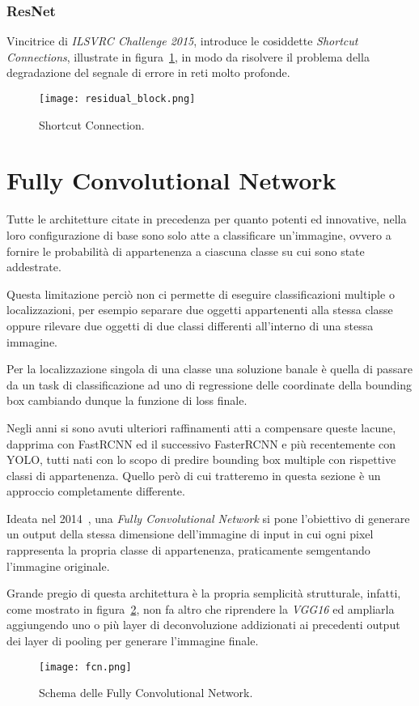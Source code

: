 \subsubsection{ResNet}
\cite{resnet}Vincitrice di \textit{ILSVRC Challenge 2015}, introduce le cosiddette \textit{Shortcut Connections}, illustrate in figura~\ref{fig:residual}, in modo da risolvere il problema della degradazione del segnale di errore in reti molto profonde.

\begin{figure}[H]
	\centering
	\texttt{[image: residual\_block.png]}
	\caption{Shortcut Connection.}
\label{fig:residual}
\end{figure}


\section{Fully Convolutional Network}
\label{sec:FCN}
Tutte le architetture citate in precedenza per quanto potenti ed innovative, nella loro configurazione di base sono solo atte a classificare un'immagine, ovvero a fornire le probabilità di appartenenza a ciascuna classe su cui sono state addestrate.\par
Questa limitazione perciò non ci permette di eseguire classificazioni multiple o localizzazioni, per esempio separare due oggetti appartenenti alla stessa classe oppure rilevare due oggetti di due classi differenti all'interno di una stessa immagine.\par
Per la localizzazione singola di una classe una soluzione banale è quella di passare da un task di classificazione ad uno di regressione delle coordinate della bounding box cambiando dunque la funzione di loss finale.\par
Negli anni si sono avuti ulteriori raffinamenti atti a compensare queste lacune, dapprima con FastRCNN\cite{fastrcnn} ed il successivo FasterRCNN\cite{fasterrcnn} e più recentemente con YOLO\cite{yolo}, tutti nati con lo scopo di predire bounding box multiple con rispettive classi di appartenenza. Quello però di cui tratteremo in questa sezione è un approccio completamente differente.\par
Ideata nel 2014~\cite{fcn}, una \textit{Fully Convolutional Network} si pone l'obiettivo di generare un output della stessa dimensione dell'immagine di input in cui ogni pixel rappresenta la propria classe di appartenenza, praticamente semgentando l'immagine originale.\par
Grande pregio di questa architettura è la propria semplicità strutturale, infatti, come mostrato in figura~\ref{fig:fcn}, non fa altro che riprendere la \textit{VGG16} ed ampliarla aggiungendo uno o più layer di deconvoluzione addizionati ai precedenti output dei layer di pooling per generare l'immagine finale.

\begin{figure}[H]
	\centering
	\texttt{[image: fcn.png]}
	\caption{Schema delle Fully Convolutional Network.}
\label{fig:fcn}
\end{figure}

